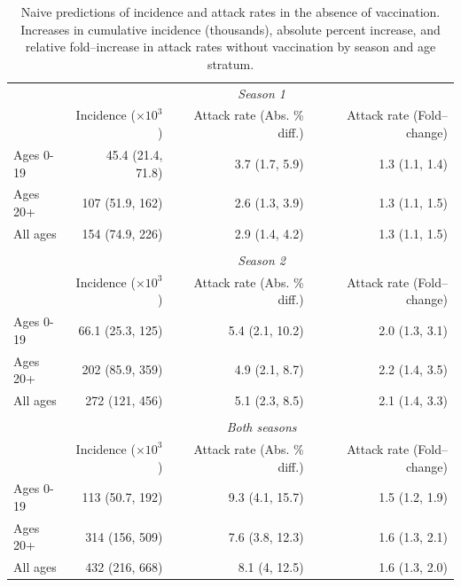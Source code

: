 \begin{table}[htbp]
	\caption[Naive predictions of incidence and attack rates in the absence of vaccination.]{Naive predictions of incidence and attack rates in the absence of vaccination. Increases in cumulative incidence (thousands), absolute percent increase, and relative fold--increase in attack rates without vaccination by season and age stratum.}
	\label{tab:flu_novacc_ests}
	\centering\footnotesize
	\begin{tabular}{lrrr}
		\hline
		&\multicolumn{3}{c}{\textit{Season 1}}\\
		\cmidrule{2-4} 
		 & Incidence ($ \times10^3 $) & Attack rate (Abs. \% diff.) & Attack rate (Fold--change) \\
		 \hline
		 Ages 0-19 & 45.4 (21.4, 71.8) & 3.7 (1.7, 5.9) & 1.3 (1.1, 1.4)\\
		 Ages 20+ & 107 (51.9, 162) & 2.6 (1.3, 3.9) & 1.3 (1.1, 1.5)\\
		 All ages & 154 (74.9, 226) & 2.9 (1.4, 4.2) & 1.3 (1.1, 1.5)\\
		 \hline
		 &&&\\
		 &\multicolumn{3}{c}{\textit{Season 2}}\\
		 \cmidrule{2-4} 
		 &Incidence ($ \times10^3 $) & Attack rate (Abs. \% diff.) & Attack rate (Fold--change) \\
		 \hline
		 Ages 0-19 & 66.1 (25.3, 125) & 5.4 (2.1, 10.2) & 2.0 (1.3, 3.1)\\
		 Ages 20+ & 202 (85.9, 359) & 4.9 (2.1, 8.7) & 2.2 (1.4, 3.5)\\
		 All ages & 272 (121, 456) & 5.1 (2.3, 8.5) & 2.1 (1.4, 3.3)\\
		 \hline
		  &&&\\
		 &\multicolumn{3}{c}{\textit{Both seasons}}\\
		 \cmidrule{2-4} 
		 &Incidence ($ \times10^3 $)& Attack rate (Abs. \% diff.) & Attack rate (Fold--change) \\
		 \hline
		 Ages 0-19 & 113 (50.7, 192) & 9.3 (4.1, 15.7) & 1.5 (1.2, 1.9)\\
		 Ages 20+ & 314 (156, 509) & 7.6 (3.8, 12.3) & 1.6 (1.3, 2.1)\\
		 All ages & 432 (216, 668) & 8.1 (4, 12.5) & 1.6 (1.3, 2.0)\\
		\hline
		\hline
	\end{tabular}
\end{table}

